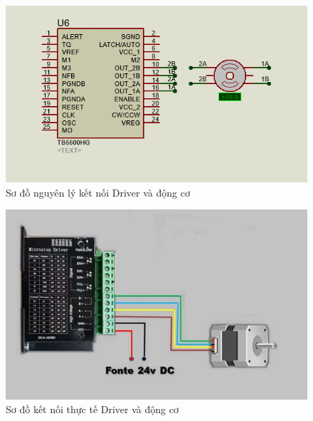 \begin{figure}[htp]
	\centering
	\includegraphics[scale=1]{Chapters/Chapter4/Images/DriverDongco.png}
	\caption{Sơ đồ nguyên lý kết nối Driver và động cơ}
	\label{fig:C4NLDriverDC}
\end{figure}
\begin{figure}[htp]
	\centering
	\includegraphics[scale=1]{Chapters/Chapter4/Images/RealDriverDongco.png}
	\caption{Sơ đồ kết nối thực tế Driver và động cơ}
	\label{fig:C4RealDriverDC}
\end{figure}
